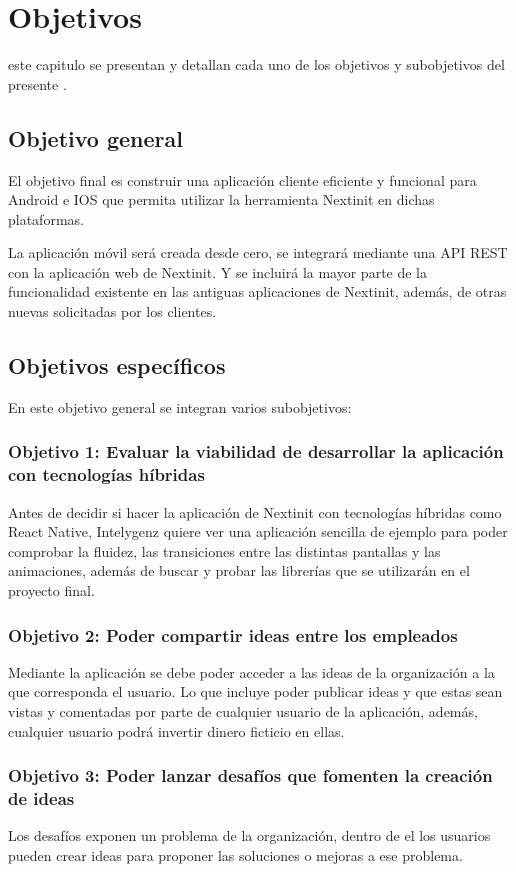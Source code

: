 \chapter{Objetivos}
\label{chap:objetivos}

 este capitulo se presentan y detallan cada uno de los objetivos y subobjetivos
del presente .

\section{Objetivo general}

El objetivo final es construir una aplicación cliente eficiente y funcional para Android e IOS
que permita utilizar la herramienta Nextinit en dichas plataformas.

La aplicación móvil será creada desde cero, se integrará mediante una API REST con la aplicación 
web de Nextinit. Y se incluirá la mayor parte de la funcionalidad existente en las antiguas 
aplicaciones de Nextinit, además, de otras nuevas solicitadas por los clientes.


\section{Objetivos específicos}

En este objetivo general se integran varios subobjetivos:

\subsection{Objetivo 1: Evaluar la viabilidad de desarrollar la aplicación con tecnologías híbridas}

Antes de decidir si hacer la aplicación de Nextinit con tecnologías híbridas como React Native, Intelygenz quiere ver
una aplicación sencilla de ejemplo para poder comprobar la fluidez, las transiciones entre las distintas pantallas y las
animaciones, además de buscar y probar las librerías que se utilizarán en el proyecto final.

\subsection{Objetivo 2: Poder compartir ideas entre los empleados}

Mediante la aplicación se debe poder acceder a las ideas de la organización a la que corresponda el usuario. Lo que 
incluye poder publicar ideas y que estas sean vistas y comentadas por parte de cualquier usuario de la aplicación, además, 
cualquier usuario podrá invertir dinero ficticio en ellas.

\subsection{Objetivo 3: Poder lanzar desafíos que fomenten la creación de ideas}
Los desafíos exponen un problema de la organización, dentro de el los usuarios pueden crear ideas para
proponer las soluciones o mejoras a ese problema.



